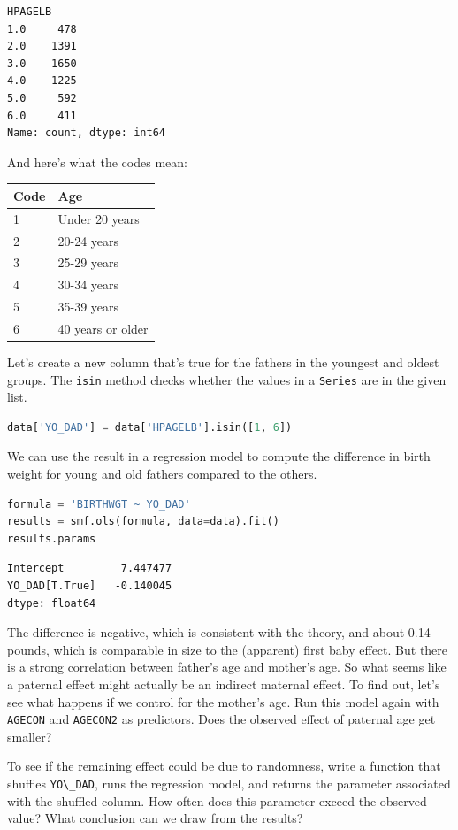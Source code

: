 \begin{lstlisting}[style=output]
HPAGELB
1.0     478
2.0    1391
3.0    1650
4.0    1225
5.0     592
6.0     411
Name: count, dtype: int64
\end{lstlisting}

And here's what the codes mean:

\begin{longtable}[]{@{}ll@{}}
\midrule()
Code & Age \\
\midrule()
\endhead
1 & Under 20 years \\
2 & 20-24 years \\
3 & 25-29 years \\
4 & 30-34 years \\
5 & 35-39 years \\
6 & 40 years or older \\
\midrule()
\end{longtable}

Let's create a new column that's true for the fathers in the youngest
and oldest groups. The \passthrough{\lstinline!isin!} method checks
whether the values in a \passthrough{\lstinline!Series!} are in the
given list.

\begin{lstlisting}[language=Python,style=source]
data['YO_DAD'] = data['HPAGELB'].isin([1, 6])
\end{lstlisting}

We can use the result in a regression model to compute the difference in
birth weight for young and old fathers compared to the others.

\begin{lstlisting}[language=Python,style=source]
formula = 'BIRTHWGT ~ YO_DAD'
results = smf.ols(formula, data=data).fit()
results.params
\end{lstlisting}

\begin{lstlisting}[style=output]
Intercept         7.447477
YO_DAD[T.True]   -0.140045
dtype: float64
\end{lstlisting}

The difference is negative, which is consistent with the theory, and
about 0.14 pounds, which is comparable in size to the (apparent) first
baby effect. But there is a strong correlation between father's age and
mother's age. So what seems like a paternal effect might actually be an
indirect maternal effect. To find out, let's see what happens if we
control for the mother's age. Run this model again with
\passthrough{\lstinline!AGECON!} and \passthrough{\lstinline!AGECON2!}
as predictors. Does the observed effect of paternal age get smaller?

To see if the remaining effect could be due to randomness, write a
function that shuffles \passthrough{\lstinline!YO\_DAD!}, runs the
regression model, and returns the parameter associated with the shuffled
column. How often does this parameter exceed the observed value? What
conclusion can we draw from the results?


